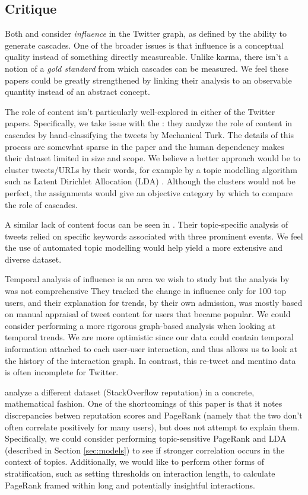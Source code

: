 \documentclass[10pt]{article}
\begin{document}
\subsection{Critique} 
Both \citet{bakshy2011everyone} and
\citet{cha2010measuring} consider \textit{influence} in the Twitter graph, as
defined by the ability to generate cascades. One of the broader issues is that
influence is a conceptual quality instead of something directly measureable.
Unlike karma, there isn't a notion of a \textit{gold standard} from which
cascades can be measured.  We feel these papers could be greatly strengthened
by linking their analysis to an observable quantity instead of an abstract
concept.

The role of content isn't particularly well-explored in either of the Twitter papers.
Specifically, we take issue with the \citet{bakshy2011everyone}: they analyze
the role of content in cascades by hand-classifying the tweets by Mechanical Turk.
The details of this process are somewhat sparse in the paper and the human
dependency makes their dataset limited in size and scope. We believe a better
approach would be to cluster tweets/URLs by their words, for example by
a topic modelling algorithm such as Latent Dirichlet Allocation (LDA)
\citep{blei2003latent}. Although the clusters would not be perfect, the assignments
would give an objective category by which to compare the role of cascades.

A similar lack of content focus can be seen in \citet{cha2010measuring}. Their
topic-specific analysis of tweets relied on specific keywords associated with
three prominent events. We feel the use of automated topic modelling would help
yield a more extensive and diverse dataset.

Temporal analysis of influence is an area we wish to study but
the analysis by \citet{cha2010measuring} was not comprehensive
They tracked the change in influence only for 100 top users, and
their explanation for trends, by their own admission, was mostly 
based on manual appraisal of tweet content for users that became popular.
We could consider performing a more rigorous graph-based analysis when looking at temporal
trends. We are more optimistic since our data
could contain temporal information attached to each user-user interaction,
and thus allows us to look at the history of the interaction graph. In contrast, this
re-tweet and mentino data is often incomplete for Twitter.

\citet{movshovitzanalysis} analyze a different dataset (StackOverflow
reputation) in a concrete, mathematical fashion.  One of the shortcomings of
this paper is that it notes discrepancies betwen reputation scores and PageRank
(namely that the two don't often correlate positively for many users), but does
not attempt to explain them. Specifically, we could consider performing
topic-sensitive PageRank and LDA (described in Section
\ref{sec:models}) to see if stronger correlation occurs in the context of
topics.  Additionally, we would like to perform other forms of
stratification, such as setting thresholds on interaction length, to calculate
PageRank framed within long and potentially insightful interactions.
\end{document}
